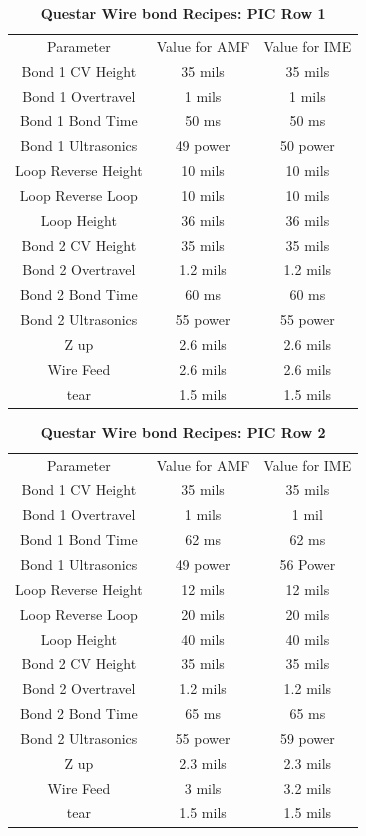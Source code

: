 \begin{table}[!ht]
\caption[Questar Wire bond Recipes: PIC Row 1]{\textbf{Questar Wire bond Recipes: PIC Row 1}}
\centering
\begin{tabular}{|c||c||c|}
\hline
Parameter & Value for AMF & Value for IME \\ \hhline{|=|=|=|}
Bond 1 CV Height & 35 mils & 35 mils \\ \hline
Bond 1 Overtravel & 1 mils & 1 mils \\ \hline
Bond 1 Bond Time & 50 ms & 50 ms \\ \hline
Bond 1 Ultrasonics & 49 power & 50 power \\ \hline
Loop Reverse Height & 10 mils & 10 mils \\ \hline 
Loop Reverse Loop & 10 mils & 10 mils \\ \hline
Loop Height & 36 mils & 36 mils \\ \hline
Bond 2 CV Height & 35 mils & 35 mils \\ \hline
Bond 2 Overtravel &  1.2 mils & 1.2 mils \\ \hline
Bond 2 Bond Time & 60 ms & 60 ms \\ \hline
Bond 2 Ultrasonics & 55 power & 55 power \\ \hline
Z up & 2.6 mils & 2.6 mils \\ \hline
Wire Feed & 2.6 mils & 2.6 mils \\ \hline
tear & 1.5 mils & 1.5 mils  \\ \hline
\end{tabular}
\end{table}

\begin{table}[!ht]
\caption[Questar Wire bond Recipes: PIC Row 2]{\textbf{Questar Wire bond Recipes: PIC Row 2}}
\centering
\begin{tabular}{|c||c||c|}
\hline
Parameter & Value for AMF & Value for IME \\ \hhline{|=|=|=|}
Bond 1 CV Height & 35 mils & 35 mils \\ \hline
Bond 1 Overtravel &  1 mils & 1 mil \\ \hline
Bond 1 Bond Time & 62 ms & 62 ms \\ \hline
Bond 1 Ultrasonics & 49 power  & 56 Power \\ \hline
Loop Reverse Height & 12 mils & 12 mils \\ \hline 
Loop Reverse Loop & 20 mils & 20 mils \\ \hline
Loop Height & 40 mils & 40 mils \\ \hline
Bond 2 CV Height & 35 mils  & 35 mils \\ \hline
Bond 2 Overtravel & 1.2 mils & 1.2 mils \\ \hline
Bond 2 Bond Time &  65 ms &  65 ms\\ \hline
Bond 2 Ultrasonics & 55 power  &  59 power \\ \hline
Z up & 2.3 mils & 2.3 mils \\ \hline
Wire Feed & 3 mils & 3.2 mils \\ \hline
tear &  1.5 mils & 1.5 mils \\  \hline
\end{tabular}
\end{table}

